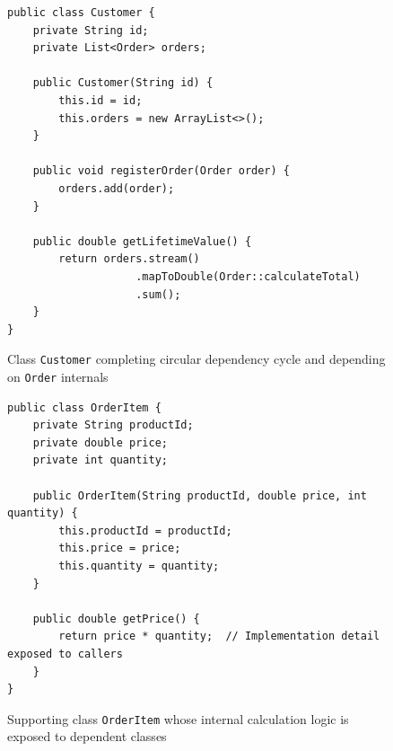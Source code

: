 \begin{figure}[htbp]
    \centering
    \begin{verbatim}
public class Customer {
    private String id;
    private List<Order> orders;
    
    public Customer(String id) {
        this.id = id;
        this.orders = new ArrayList<>();
    }
    
    public void registerOrder(Order order) {
        orders.add(order);
    }
    
    public double getLifetimeValue() {
        return orders.stream()
                    .mapToDouble(Order::calculateTotal)
                    .sum();
    }
}
    \end{verbatim}
    \caption{Class \texttt{Customer} completing circular dependency cycle and depending on \texttt{Order} internals}
    \label{fig:customer-circular}
\end{figure}

\begin{figure}[htbp]
    \centering
    \begin{verbatim}
public class OrderItem {
    private String productId;
    private double price;
    private int quantity;
    
    public OrderItem(String productId, double price, int quantity) {
        this.productId = productId;
        this.price = price;
        this.quantity = quantity;
    }
    
    public double getPrice() {
        return price * quantity;  // Implementation detail exposed to callers
    }
}
    \end{verbatim}
    \caption{Supporting class \texttt{OrderItem} whose internal calculation logic is exposed to dependent classes}
    \label{fig:orderitem-support}
\end{figure}


